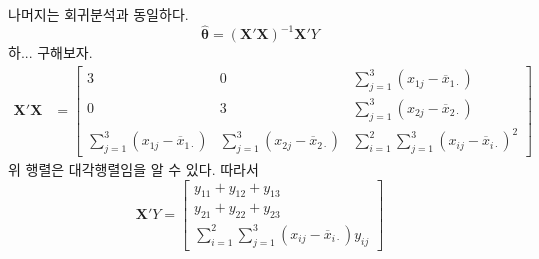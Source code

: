 \documentclass[answers]{exam}
\newcommand{\bs}{\boldsymbol}
\begin{document}
\begin{questions}
\begin{solution}
\begin{enumerate}[(a)]
\begin{align}
      \end{align}
      나머지는 회귀분석과 동일하다.
      \begin{equation}
        \widehat{\bs{\theta}} = \left(\mathbf{X}'\mathbf{X}\right)^{-1}\mathbf{X}'Y
      \end{equation}
      하... 구해보자.
      \begin{align}
        \mathbf{X}'\mathbf{X} &= \begin{bmatrix}3 & 0 & \displaystyle\sum_{j=1}^{3}\left(x_{1j}-\overline{x}_{1\cdot}\right)\\ 0 & 3 &  \displaystyle\sum_{j=1}^{3}\left(x_{2j}-\overline{x}_{2\cdot}\right)\\\displaystyle\sum_{j=1}^{3}\left(x_{1j}-\overline{x}_{1\cdot}\right)& \displaystyle\sum_{j=1}^{3}\left(x_{2j}-\overline{x}_{2\cdot}\right) & \displaystyle\sum_{i=1}^{2}\sum_{j=1}^{3}\left(x_{ij}-\overline{x}_{i\cdot}\right)^{2} \end{bmatrix}
      \end{align}
      위 행렬은 대각행렬임을 알 수 있다. 따라서
      \begin{equation}
        \mathbf{X}'Y = \begin{bmatrix}y_{11}+y_{12}+y_{13}\\y_{21}+y_{22}+y_{23}\\\displaystyle \sum_{i=1}^{2}\sum_{j=1}^{3}\left(x_{ij}-\overline{x}_{i\cdot}\right)y_{ij}  \end{bmatrix}

\end{equation}
\end{enumerate}
\end{solution}
\end{questions}
\end{document}
